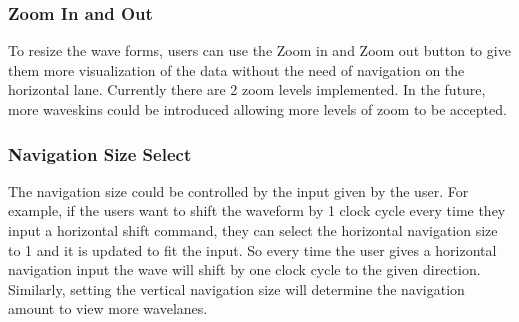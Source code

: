 \documentclass[14pt]{extarticle}
\begin{document}
 \subsubsection{Zoom In and Out}
 To resize the wave forms, users can use the Zoom in and Zoom out button to give them more visualization of the data without the need of navigation on the horizontal lane. Currently there are 2 zoom levels implemented. In the future, more waveskins could be introduced allowing more levels of zoom to be accepted.
 \subsubsection{Navigation Size Select}
 The navigation size could be controlled by the input given by the user. For example, if the users want to shift the waveform by 1 clock cycle every time they input a horizontal shift command, they can select the horizontal navigation size to 1 and it is updated to fit the input. So every time the user gives a horizontal navigation input the wave will shift by one clock cycle to the given direction. Similarly, setting the vertical navigation size will determine the navigation amount to view more wavelanes.
 \newpage
\end{document}
